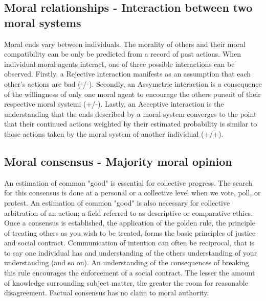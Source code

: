 \documentclass{book}
\begin{document}
\subsection{Moral relationships - Interaction between two moral systems}
Moral ends vary between individuals.
The morality of others and their moral compatibility can be only be predicted from a record of past actions.
When individual moral agents interact, one of three possible interactions can be observed.
Firstly, a Rejective interaction manifests as an assumption that each other's actions are bad (-/-). 
Secondly, an Assymetric interaction is a consequence of the willingness of only one moral agent to encourage the others pursuit of their respective moral systemi (+/-).
Lastly, an Acceptive interaction is the understanding that the ends described by a moral system converges to the point that their continued actions weighted by their estimated probability is similar to those actions taken by the moral system of another individual (+/+).

\subsection{Moral consensus - Majority moral opinion}
An estimation of common "good" is essential for collective progress.
The search for this consensus is done at a personal or a collective level when we vote, poll, or protest. 
An estimation of common "good" is also necessary for collective arbitration of an action; a field referred to as descriptive or comparative ethics.
Once a consensus is established, the application of the golden rule, the principle of treating others as you wish to be treated, forms the basic principles of justice and social contract.
Communication of intention can often be reciprocal, that is to say one individual has and understanding of the others understanding of your understanding (and so on).
An understanding of the consequences of breaking this rule encourages the enforcement of a social contract.
The lesser the amount of knowledge surrounding subject matter, the greater the room for reasonable disagreement. 
Factual consensus has no claim to moral authority.
\end{document}
